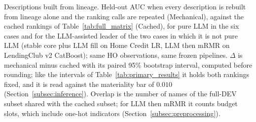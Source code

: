\documentclass[final,5p,twocolumn]{elsarticle}
\newcommand{\Kfeat}{K}
\providecommand{\DIFdeltex}[1]{{\protect\color{red} \scriptsize #1}} %
\providecommand{\DIFdelFL}[1]{\DIFdel{#1}} %
\providecommand{\DIFdelbeginFL}{} %
\providecommand{\DIFdelendFL}{} %
\providecommand{\DIFdel}[1]{\texorpdfstring{\DIFdeltex{#1}}{}} %
\begin{document}
\begin{table}[htbp]
\centering
\footnotesize
\DIFdelbeginFL %
{%
\DIFdelFL{Descriptions built from lineage. Held-out AUC when every description is rebuilt from lineage alone and the ranking calls are repeated (Mechanical), against the cached rankings of Table~\ref{tab:full_matrix} (Cached), for pure LLM in the six cases and for the LLM-assisted leader of the two cases in which it is not pure LLM (stable core plus LLM fill on Home Credit LR, LLM then mRMR on LendingClub v2 CatBoost); same HO observations, same frozen pipelines. $\Delta$ is mechanical minus cached with its paired 95\% bootstrap interval, computed before rounding; like the intervals of Table~\ref{tab:primary_results} it holds both rankings fixed, and it is read against the materiality bar of $0.010$ (Section~\ref{subsec:inference}). Overlap is the number of names of the full-DEV subset shared with the cached subset; for LLM then mRMR it counts budget slots, which include one-hot indicators (Section~\ref{subsec:preprocessing}).}}
\DIFdelendFL \setlength{\tabcolsep}{5pt}
\DIFdelbeginFL %

\end{table}
\end{document}

